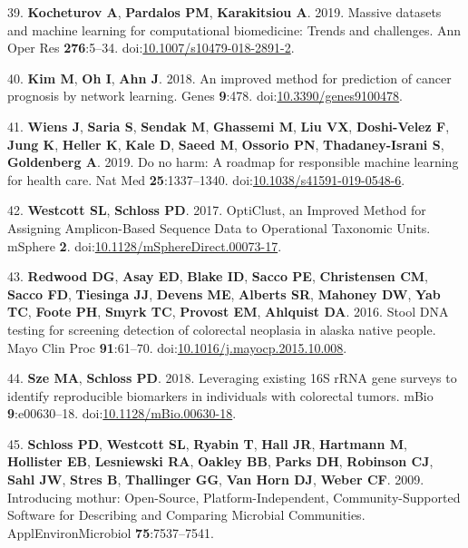 \documentclass[11pt,]{article}
\begin{document}
\hypertarget{ref-kocheturov_massive_2019}{}
39. \textbf{Kocheturov A}, \textbf{Pardalos PM}, \textbf{Karakitsiou A}.
2019. Massive datasets and machine learning for computational
biomedicine: Trends and challenges. Ann Oper Res \textbf{276}:5--34.
doi:\href{https://doi.org/10.1007/s10479-018-2891-2}{10.1007/s10479-018-2891-2}.

\hypertarget{ref-kim_improved_2018}{}
40. \textbf{Kim M}, \textbf{Oh I}, \textbf{Ahn J}. 2018. An improved
method for prediction of cancer prognosis by network learning. Genes
\textbf{9}:478.
doi:\href{https://doi.org/10.3390/genes9100478}{10.3390/genes9100478}.

\hypertarget{ref-wiens_no_2019}{}
41. \textbf{Wiens J}, \textbf{Saria S}, \textbf{Sendak M},
\textbf{Ghassemi M}, \textbf{Liu VX}, \textbf{Doshi-Velez F},
\textbf{Jung K}, \textbf{Heller K}, \textbf{Kale D}, \textbf{Saeed M},
\textbf{Ossorio PN}, \textbf{Thadaney-Israni S}, \textbf{Goldenberg A}.
2019. Do no harm: A roadmap for responsible machine learning for health
care. Nat Med \textbf{25}:1337--1340.
doi:\href{https://doi.org/10.1038/s41591-019-0548-6}{10.1038/s41591-019-0548-6}.

\hypertarget{ref-westcott_opticlust_2017}{}
42. \textbf{Westcott SL}, \textbf{Schloss PD}. 2017. OptiClust, an
Improved Method for Assigning Amplicon-Based Sequence Data to
Operational Taxonomic Units. mSphere \textbf{2}.
doi:\href{https://doi.org/10.1128/mSphereDirect.00073-17}{10.1128/mSphereDirect.00073-17}.

\hypertarget{ref-redwood_stool_2016}{}
43. \textbf{Redwood DG}, \textbf{Asay ED}, \textbf{Blake ID},
\textbf{Sacco PE}, \textbf{Christensen CM}, \textbf{Sacco FD},
\textbf{Tiesinga JJ}, \textbf{Devens ME}, \textbf{Alberts SR},
\textbf{Mahoney DW}, \textbf{Yab TC}, \textbf{Foote PH}, \textbf{Smyrk
TC}, \textbf{Provost EM}, \textbf{Ahlquist DA}. 2016. Stool DNA testing
for screening detection of colorectal neoplasia in alaska native people.
Mayo Clin Proc \textbf{91}:61--70.
doi:\href{https://doi.org/10.1016/j.mayocp.2015.10.008}{10.1016/j.mayocp.2015.10.008}.

\hypertarget{ref-sze_leveraging_2018}{}
44. \textbf{Sze MA}, \textbf{Schloss PD}. 2018. Leveraging existing 16S
rRNA gene surveys to identify reproducible biomarkers in individuals
with colorectal tumors. mBio \textbf{9}:e00630--18.
doi:\href{https://doi.org/10.1128/mBio.00630-18}{10.1128/mBio.00630-18}.

\hypertarget{ref-schloss_introducing_2009}{}
45. \textbf{Schloss PD}, \textbf{Westcott SL}, \textbf{Ryabin T},
\textbf{Hall JR}, \textbf{Hartmann M}, \textbf{Hollister EB},
\textbf{Lesniewski RA}, \textbf{Oakley BB}, \textbf{Parks DH},
\textbf{Robinson CJ}, \textbf{Sahl JW}, \textbf{Stres B},
\textbf{Thallinger GG}, \textbf{Van Horn DJ}, \textbf{Weber CF}. 2009.
Introducing mothur: Open-Source, Platform-Independent,
Community-Supported Software for Describing and Comparing Microbial
Communities. ApplEnvironMicrobiol \textbf{75}:7537--7541.
\end{document}
